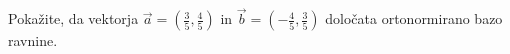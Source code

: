 \documentclass[addpoints]{exam}
\begin{document}
\begin{questions}







        








    \question[3]
    Pokažite, da vektorja $\overrightarrow{a}=\left(\frac{3}{5},\frac{4}{5}\right)$ in $\overrightarrow{b}=\left(-\frac{4}{5},\frac{3}{5}\right)$ določata ortonormirano bazo ravnine.

    \begin{solution}[1cm]

    \end{solution}



\end{questions}
\end{document}
